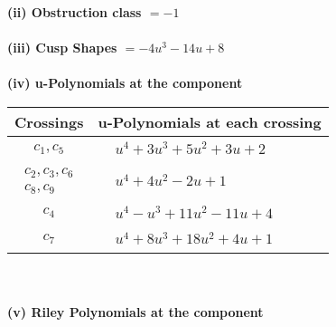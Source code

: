 \documentclass[1p]{elsarticle_modified}
\theoremstyle{definition}
\begin{document}
\flushleft \textbf{(ii) Obstruction class $= -1$}\\~\\
\flushleft \textbf{(iii) Cusp Shapes $= -4 u^3-14 u+8$}\\~\\
\newpage\renewcommand{\arraystretch}{1}
\flushleft \textbf{(iv) u-Polynomials at the component}\newline \\
\begin{tabular}{m{50pt}|m{274pt}}
Crossings & \hspace{64pt}u-Polynomials at each crossing \\
\hline $$\begin{aligned}c_{1},c_{5}\end{aligned}$$&$\begin{aligned}
&u^4+3 u^3+5 u^2+3 u+2
\end{aligned}$\\
\hline $$\begin{aligned}c_{2},c_{3},c_{6}\\c_{8},c_{9}\end{aligned}$$&$\begin{aligned}
&u^4+4 u^2-2 u+1
\end{aligned}$\\
\hline $$\begin{aligned}c_{4}\end{aligned}$$&$\begin{aligned}
&u^4- u^3+11 u^2-11 u+4
\end{aligned}$\\
\hline $$\begin{aligned}c_{7}\end{aligned}$$&$\begin{aligned}
&u^4+8 u^3+18 u^2+4 u+1
\end{aligned}$\\
\hline
\end{tabular}\\~\\
\newpage\renewcommand{\arraystretch}{1}
\flushleft \textbf{(v) Riley Polynomials at the component}\newline \\
\end{document}
